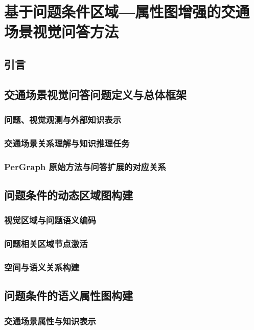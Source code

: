 
\chapter{基于问题条件区域—属性图增强的交通场景视觉问答方法}

\section{引言}

\section{交通场景视觉问答问题定义与总体框架}
\subsection{问题、视觉观测与外部知识表示}
\subsection{交通场景关系理解与知识推理任务}
\subsection{PerGraph 原始方法与问答扩展的对应关系}

\section{问题条件的动态区域图构建}
\subsection{视觉区域与问题语义编码}
\subsection{问题相关区域节点激活}
\subsection{空间与语义关系构建}

\section{问题条件的语义属性图构建}
\subsection{交通场景属性与知识表示}
